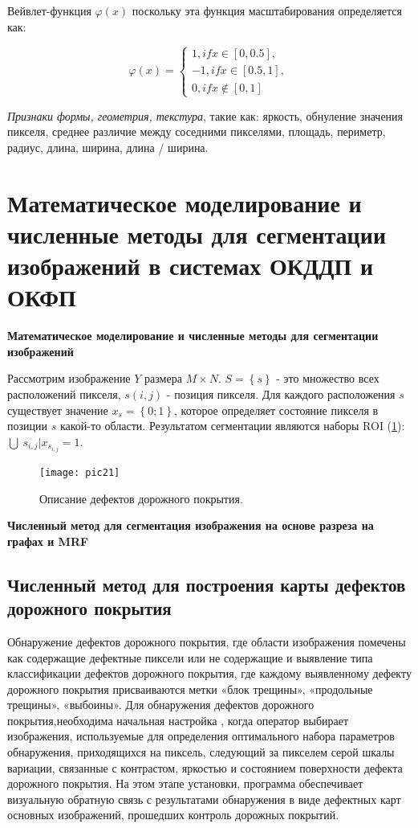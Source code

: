 \documentclass[a4paper,14pt]{extreport}
\begin{document}
Вейвлет-функция $\varphi\left(x\right)$ поскольку эта функция масштабирования определяется как:

\begin{equation} \label{eq6}
\varphi\left(x\right)= \left\{\begin{array}{l} 1, if x \in \left[0,0.5\right],\\
-1, if x \in \left[0.5,1\right],\\
0, if x \notin \left[0,1\right]
\end{array}\right.
\end{equation}

\textit{Признаки формы, геометрия, текстура}, такие как: яркость, обнуление значения пикселя, среднее различие между соседними пикселями, площадь, периметр, радиус, длина, ширина, длина / ширина.

\section{Математическое моделирование и численные методы для сегментации изображений в системах ОКДДП и ОКФП} \label{part2}
\textbf{Математическое моделирование и численные методы для сегментации изображений}

Рассмотрим изображение $Y$ размера $M \times N$. $S = \left\{s\right\}$ - это множество всех расположений пикселя, $s \left(i, j\right)$ - позиция пикселя. Для каждого расположения $s$ существует значение $x_s=\left\{0;1\right\}$, которое определяет состояние пикселя в позиции $s$ какой-то области. Результатом сегментации являются наборы ROI (\ref{pic21}): $\bigcup\ s_{i,j} | x_{s_{i,j}}=1$.

\begin{figure}[ht!]
\centering
\texttt{[image: pic21]}
\caption{Описание дефектов дорожного покрытия.}
	\label{pic21}
		\end{figure} 
		
\textbf{Численный метод для сегментация изображения на основе разреза на графах и MRF}
\subsection{Численный метод для построения карты дефектов дорожного покрытия}
Обнаружение дефектов дорожного покрытия, где области изображения помечены как содержащие дефектные пиксели или не содержащие и  выявление типа классификации дефектов дорожного покрытия, где каждому выявленному дефекту дорожного покрытия присваиваются метки «блок трещины», «продольные трещины», «выбоины». Для обнаружения дефектов дорожного покрытия,необходима начальная настройка , когда оператор выбирает изображения, используемые для определения оптимального набора параметров обнаружения, приходящихся на пиксель, следующий за пикселем серой шкалы вариации, связанные с контрастом, яркостью и состоянием поверхности дефекта дорожного покрытия. На этом этапе установки, программа обеспечивает визуальную обратную связь с результатами обнаружения в виде дефектных карт основных изображений, прошедших контроль дорожных покрытий.		
	
\end{document}
